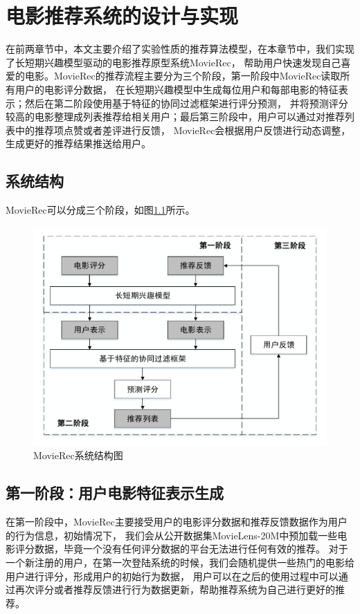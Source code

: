 \chapter{电影推荐系统的设计与实现}
在前两章节中，本文主要介绍了实验性质的推荐算法模型，在本章节中，我们实现了长短期兴趣模型驱动的电影推荐原型系统MovieRec，
帮助用户快速发现自己喜爱的电影。MovieRec的推荐流程主要分为三个阶段，第一阶段中MovieRec读取所有用户的电影评分数据，
在长短期兴趣模型中生成每位用户和每部电影的特征表示；然后在第二阶段使用基于特征的协同过滤框架进行评分预测，
并将预测评分较高的电影整理成列表推荐给相关用户；最后第三阶段中，用户可以通过对推荐列表中的推荐项点赞或者差评进行反馈，
MovieRec会根据用户反馈进行动态调整，生成更好的推荐结果推送给用户。

\section{系统结构}
MovieRec可以分成三个阶段，如图\ref{fig:system}所示。

\begin{figure}[htbp]
\centering
\includegraphics[scale=0.7]{images/system.pdf}
\caption{MovieRec系统结构图}
\label{fig:system}
\end{figure}

\section{第一阶段：用户电影特征表示生成}
在第一阶段中，MovieRec主要接受用户的电影评分数据和推荐反馈数据作为用户的行为信息，初始情况下，
我们会从公开数据集MovieLens-20M中预加载一些电影评分数据，毕竟一个没有任何评分数据的平台无法进行任何有效的推荐。
对于一个新注册的用户，在第一次登陆系统的时候，我们会随机提供一些热门的电影给用户进行评分，形成用户的初始行为数据，
用户可以在之后的使用过程中可以通过再次评分或者推荐反馈进行行为数据更新，帮助推荐系统为自己进行更好的推荐。

